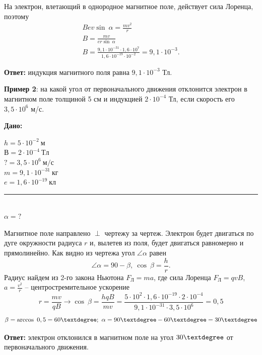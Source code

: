 \documentclass[a6paper, 11pt]{diss_4}
\renewcommand{\'}{\,'}
\begin{document}
На электрон, влетающий в однородное магнитное поле, действует сила Лоренца, поэтому
\begin{gather*}
  Bev\sin\ \alpha=\frac{mv^2}{r}\\
  B=\frac{mv}{er\sin\ \alpha}\\
  B=\frac{9,1\cdot10^{-31}\cdot1,6\cdot10^7}{1,6\cdot10^{-19}\cdot10^{-2}}=9,1\cdot10^{-3}.
\end{gather*}

\textbf{Ответ:}  индукция магнитного поля равна $9,1\cdot10^{-3}$ Тл.


\textbf{Пример 2}: на какой угол от первоначального движения отклонится электрон в магнитном поле толщиной 5 см и индукцией
$2\cdot10^{-4}$ Тл, если скорость его $3,5\cdot10^6$ м/с.

\hspace{1cm}\textbf{Дано:}\hspace{.3cm}
\parbox[t]{4cm}{
$h= 5\cdot10^{-2}\ м$\\
$В= 2\cdot10^{-4}\ Тл$\\
$?= 3,5\cdot10^{6}\ м/с$\\
$m= 9,1\cdot10^{-31}\ кг$\\
$e= 1,6\cdot10^{-19}\ кл$\\
\rule{4cm}{.4pt}\\
$\alpha = ?$\\
}

Магнитное поле направлено $\perp$ чертежу за чертеж. Электрон  будет двигаться по дуге окружности радиуса $r$
и, вылетев из поля, будет двигаться равномерно  и прямолинейно. Как видно из чертежа угол $\angle \alpha$ равен
\[
\angle \alpha=90-\beta,\ \cos\ \beta=\frac{h}{r}.
\]
Радиус найдем из 2-го закона  Ньютона $F_Л=ma$, где сила Лоренца $F_Л= qvB$, $a=\frac{v^2}{r}$ -- центростремительное ускорение
\[
r=\frac{mv}{qB}\to\cos\ \beta=\frac{hqB}{mv}=
\frac{5\cdot10^2\cdot1,6\cdot10^{-19}\cdot2\cdot10^{-4}}{9,1\cdot10^{-31}\cdot3,5\cdot10^6}=0,5
\]
\[
\beta=\arccos\ 0,5=60\textdegree;\ \alpha=90\textdegree-60\textdegree=30\textdegree
\]

\textbf{Ответ:} электрон отклонился в магнитном поле на угол $30\textdegree$ от первоначального движения.
\end{document}
